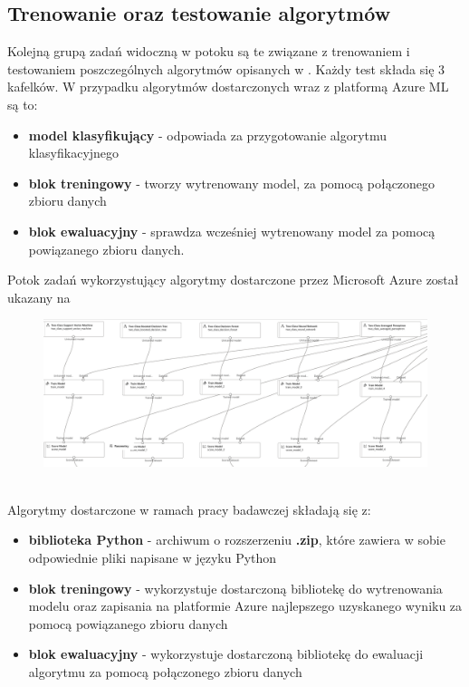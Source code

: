 \vfill
\pagebreak

\subsection{Trenowanie oraz testowanie algorytmów}
Kolejną grupą zadań widoczną w potoku są te związane z trenowaniem i testowaniem poszczególnych algorytmów opisanych w . Każdy test składa się 3 kafelków. W przypadku algorytmów dostarczonych wraz z platformą Azure ML są to:
\begin{itemize}
    \item \textbf{model klasyfikujący} - odpowiada za przygotowanie algorytmu klasyfikacyjnego
    \item \textbf{blok treningowy} - tworzy wytrenowany model, za pomocą połączonego zbioru danych
    \item \textbf{blok ewaluacyjny} - sprawdza wcześniej wytrenowany model za pomocą powiązanego zbioru danych.
\end{itemize}
Potok zadań wykorzystujący algorytmy dostarczone przez Microsoft Azure został ukazany na 

\begin{figure}[H]
    \centering
    \includegraphics[width=\textwidth]{images/ms_pipe}
    \label{fig:ms-pipe}
\end{figure}
\ \\
Algorytmy dostarczone w ramach pracy badawczej składają się z:
\begin{itemize}
    \item \textbf{biblioteka Python} - archiwum o rozszerzeniu \textbf{.zip}, które zawiera w sobie odpowiednie pliki napisane w języku Python
    \item \textbf{blok treningowy} - wykorzystuje dostarczoną bibliotekę do wytrenowania modelu oraz zapisania na platformie Azure najlepszego uzyskanego wyniku za pomocą powiązanego zbioru danych
    \item \textbf{blok ewaluacyjny} - wykorzystuje dostarczoną bibliotekę do ewaluacji algorytmu za pomocą połączonego zbioru danych
\end{itemize}

